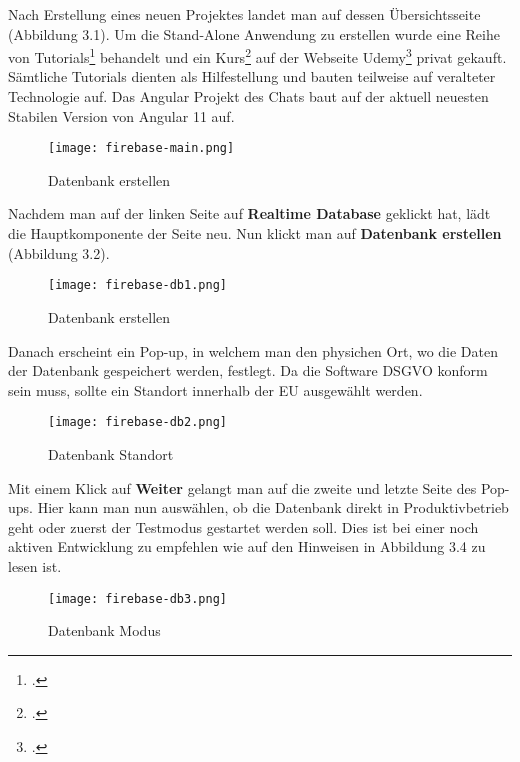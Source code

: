 Nach Erstellung eines neuen Projektes landet man auf dessen Übersichtsseite (Abbildung 3.1).
Um die Stand-Alone Anwendung zu erstellen wurde eine Reihe von Tutorials\footcite{firebase-yt-tut} behandelt und ein Kurs\footcite{firebase-tut1} auf der Webseite Udemy\footcite{udemy-course} privat gekauft.
Sämtliche Tutorials dienten als Hilfestellung und bauten teilweise auf veralteter Technologie auf. Das Angular Projekt des Chats baut auf der aktuell neuesten Stabilen Version von Angular 11 auf.
\begin{center}
    \begin{figure}[H]
        \centering
        \texttt{[image: firebase-main.png]}
        \caption{Datenbank erstellen}
    \end{figure}
\end{center}
Nachdem man auf der linken Seite auf \textbf{Realtime Database} geklickt hat, lädt die Hauptkomponente der Seite neu. Nun klickt man auf \textbf{Datenbank erstellen} (Abbildung 3.2).
\begin{center}
    \begin{figure}[H]
        \centering
        \texttt{[image: firebase-db1.png]}
        \caption{Datenbank erstellen}
    \end{figure}
\end{center}
Danach erscheint ein Pop-up, in welchem man den physichen Ort, wo die Daten der Datenbank gespeichert werden, festlegt. Da die Software DSGVO konform sein muss, sollte ein Standort innerhalb der EU ausgewählt werden.
\begin{center}
    \begin{figure}[H]
        \centering
        \texttt{[image: firebase-db2.png]}
        \caption{Datenbank Standort}
    \end{figure}
\end{center}
Mit einem Klick auf \textbf{Weiter} gelangt man auf die zweite und letzte Seite des Pop-ups.
Hier kann man nun auswählen, ob die Datenbank direkt in Produktivbetrieb geht oder zuerst der Testmodus gestartet werden soll. Dies ist bei einer
noch aktiven Entwicklung zu empfehlen wie auf den Hinweisen in Abbildung 3.4 zu lesen ist.
\begin{center}
    \begin{figure}[H]
        \centering
        \texttt{[image: firebase-db3.png]}
        \caption{Datenbank Modus}
    \end{figure}
\end{center}
